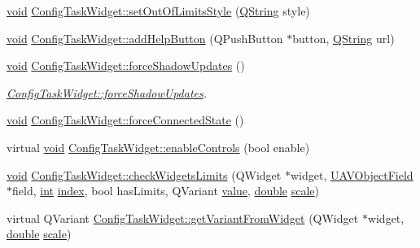 \begin{DoxyCompactItemize}
\item 
\hyperlink{group___u_a_v_objects_plugin_ga444cf2ff3f0ecbe028adce838d373f5c}{void} \hyperlink{group___u_a_v_object_widget_utils_gaefefd74c41c3c7655ae047ae80d6dba8}{Config\-Task\-Widget\-::set\-Out\-Of\-Limits\-Style} (\hyperlink{group___u_a_v_objects_plugin_gab9d252f49c333c94a72f97ce3105a32d}{Q\-String} style)
\item 
\hyperlink{group___u_a_v_objects_plugin_ga444cf2ff3f0ecbe028adce838d373f5c}{void} \hyperlink{group___u_a_v_object_widget_utils_ga369a4d9a6a1eba7ba8e61e64f1d89b80}{Config\-Task\-Widget\-::add\-Help\-Button} (Q\-Push\-Button $\ast$button, \hyperlink{group___u_a_v_objects_plugin_gab9d252f49c333c94a72f97ce3105a32d}{Q\-String} url)
\item 
\hyperlink{group___u_a_v_objects_plugin_ga444cf2ff3f0ecbe028adce838d373f5c}{void} \hyperlink{group___u_a_v_object_widget_utils_gaae2888fd71dce34ad0c33aed78952e23}{Config\-Task\-Widget\-::force\-Shadow\-Updates} ()
\begin{DoxyCompactList}\small\item\em \hyperlink{group___u_a_v_object_widget_utils_gaae2888fd71dce34ad0c33aed78952e23}{Config\-Task\-Widget\-::force\-Shadow\-Updates}. \end{DoxyCompactList}\item 
\hyperlink{group___u_a_v_objects_plugin_ga444cf2ff3f0ecbe028adce838d373f5c}{void} \hyperlink{group___u_a_v_object_widget_utils_gaef1ebd891852a741315a8b69975876e6}{Config\-Task\-Widget\-::force\-Connected\-State} ()
\item 
virtual \hyperlink{group___u_a_v_objects_plugin_ga444cf2ff3f0ecbe028adce838d373f5c}{void} \hyperlink{group___u_a_v_object_widget_utils_gaad59e4e96d1e4a59067aa44828ddaa3f}{Config\-Task\-Widget\-::enable\-Controls} (bool enable)
\item 
\hyperlink{group___u_a_v_objects_plugin_ga444cf2ff3f0ecbe028adce838d373f5c}{void} \hyperlink{group___u_a_v_object_widget_utils_ga087b6f8f17317793efa0d121fe42336a}{Config\-Task\-Widget\-::check\-Widgets\-Limits} (Q\-Widget $\ast$widget, \hyperlink{class_u_a_v_object_field}{U\-A\-V\-Object\-Field} $\ast$field, \hyperlink{ioapi_8h_a787fa3cf048117ba7123753c1e74fcd6}{int} \hyperlink{glext_8h_ab47dd9958bcadea08866b42bf358e95e}{index}, bool has\-Limits, Q\-Variant \hyperlink{glext_8h_aa0e2e9cea7f208d28acda0480144beb0}{value}, \hyperlink{_super_l_u_support_8h_a8956b2b9f49bf918deed98379d159ca7}{double} \hyperlink{glext_8h_a281421b881aa7a1266842b73a3bc7655}{scale})
\item 
virtual Q\-Variant \hyperlink{group___u_a_v_object_widget_utils_ga0bc84dd39dc77fccf26bf3a708a11733}{Config\-Task\-Widget\-::get\-Variant\-From\-Widget} (Q\-Widget $\ast$widget, \hyperlink{_super_l_u_support_8h_a8956b2b9f49bf918deed98379d159ca7}{double} \hyperlink{glext_8h_a281421b881aa7a1266842b73a3bc7655}{scale})

\end{DoxyCompactItemize}
